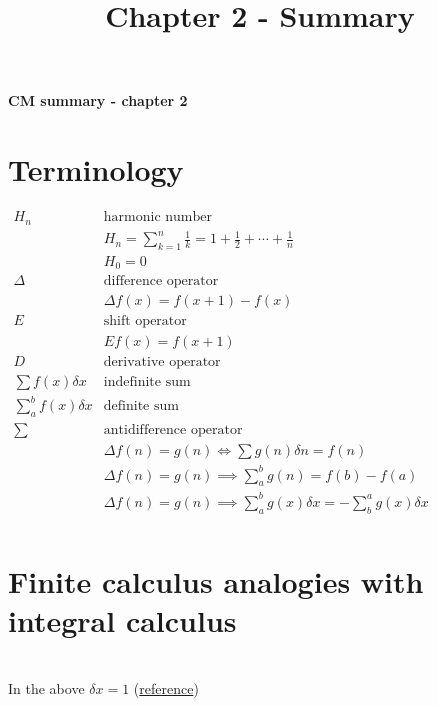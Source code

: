 \documentclass[10pt]{article}
\title{Chapter 2 - Summary}
\begin{document}
\raggedright
\footnotesize
\begin{center}
     \Large{\textbf{CM summary - chapter 2}} \\
\end{center}

\begin{multicols}{3}
\section{Terminology}
{
$
\begin{array}{ll}
H_n & \text{harmonic number} \\
    & H_n = \sum_{k=1}^n \frac{1}{k} = 1 + \frac{1}{2} + \cdots + \frac{1}{n} \\
    & H_0 = 0 \\
\Delta & \text{difference operator} \\ 
 & \Delta f(x) = f(x+1) - f(x) \\
E & \text{shift operator} \\
  & E f(x) = f(x+1) \\
D & \text{derivative operator} \\
\sum f(x) \delta x & \text{indefinite sum} \\ 
\sum_a^b f(x) \delta x & \text{definite sum} \\
\sum & \text{antidifference operator} \\
 & \Delta f(n) = g(n) \iff \sum g(n) \delta n = f(n) \\
 & \Delta f(n) = g(n) \implies \sum_{a}^b g(n) = f(b) - f(a) \\
 & \Delta f(n) = g(n) \implies \sum_a^b g(x) \delta x = -\sum_b^a g(x) \delta x  \\
\end{array}
$
}

\section{Finite calculus analogies with integral calculus}
{
\everymath{\displaystyle}
}
\\
\vspace{0.3cm}
In the above $\delta x = 1$ (\href{https://math.stackexchange.com/a/235691}{reference})

\end{multicols}
\end{document}
